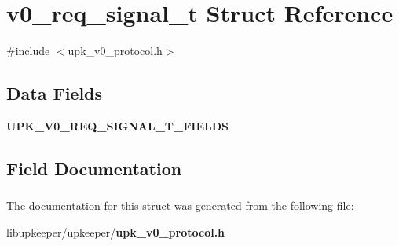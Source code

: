 \section{v0\_\-req\_\-signal\_\-t Struct Reference}
\label{structv0__req__signal__t}


{\ttfamily \#include $<$upk\_\-v0\_\-protocol.h$>$}

\subsection*{Data Fields}
\begin{DoxyCompactItemize}
\item 
{\bf UPK\_\-V0\_\-REQ\_\-SIGNAL\_\-T\_\-FIELDS}
\end{DoxyCompactItemize}


\subsection{Field Documentation}
\subsubsection[{UPK\_\-V0\_\-REQ\_\-SIGNAL\_\-T\_\-FIELDS}]{}\label{structv0__req__signal__t_a9a563de2d6480dc749ddd1edb5843450}


The documentation for this struct was generated from the following file:\begin{DoxyCompactItemize}
\item 
libupkeeper/upkeeper/{\bf upk\_\-v0\_\-protocol.h}\end{DoxyCompactItemize}
